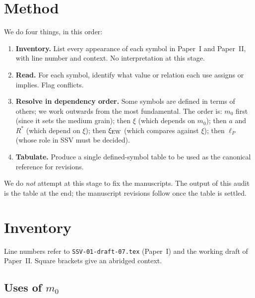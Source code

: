 \documentclass[11pt,a4paper]{article}
\begin{document}
\tableofcontents
\newpage

\section{Method}

We do four things, in this order:
\begin{enumerate}
\item \textbf{Inventory.} List every appearance of each symbol in Paper~I and
      Paper~II, with line number and context.  No interpretation at this stage.
\item \textbf{Read.} For each symbol, identify what value or relation each use
      assigns or implies.  Flag conflicts.
\item \textbf{Resolve in dependency order.}  Some symbols are defined in
      terms of others; we work outwards from the most fundamental.  The order
      is: $m_0$ first (since it sets the medium grain); then $\xi$ (which
      depends on $m_0$); then $a$ and $R^*$ (which depend on $\xi$); then
      $\xi_{\rm EW}$ (which compares against $\xi$); then $\ell_P$ (whose
      role in SSV must be decided).
\item \textbf{Tabulate.}  Produce a single defined-symbol table to be used
      as the canonical reference for revisions.
\end{enumerate}

We do \emph{not} attempt at this stage to fix the manuscripts.  The output
of this audit is the table at the end; the manuscript revisions follow once
the table is settled.

\section{Inventory}

Line numbers refer to \texttt{SSV-01-draft-07.tex} (Paper~I) and the working
draft of Paper~II.  Square brackets give an abridged context.

\subsection{Uses of $m_0$}
\end{document}
